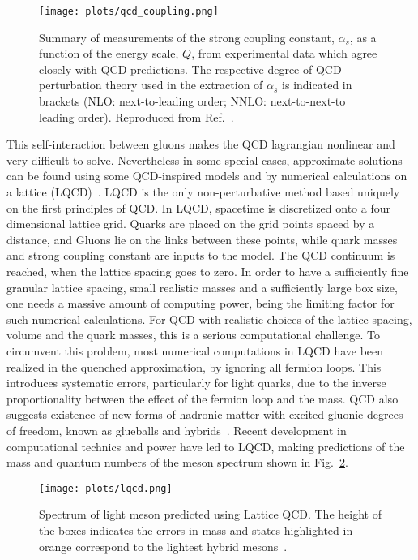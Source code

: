 \begin{figure}[!t]
    \centering
        \texttt{[image: plots/qcd\_coupling.png]}
        \caption{Summary of measurements of the strong coupling constant, $\alpha_{s}$, as a function of the energy scale, $Q$, from experimental data which agree closely with QCD predictions. The respective degree of QCD perturbation theory used in the extraction of $\alpha_{s}$ is indicated in brackets (NLO: next-to-leading order; NNLO: next-to-next-to leading order). Reproduced from Ref.~\cite{Tanabashi18}.}
        \label{fig.1.1.2}
\end{figure}

This self-interaction between gluons makes the QCD lagrangian nonlinear and very difficult to solve. Nevertheless in some special cases, approximate solutions can be found using some QCD-inspired models and by numerical calculations on a lattice (LQCD)~\cite{Dudek13}. LQCD is the only non-perturbative method based uniquely on the first principles of QCD. In LQCD, spacetime is discretized onto a four dimensional lattice grid. Quarks are placed on the grid points spaced by a distance, and Gluons lie on the links between these points, while quark masses and strong coupling constant are inputs to the model. The QCD continuum is reached, when the lattice spacing goes to zero. In order to have a sufficiently fine granular lattice spacing, small realistic masses and a sufficiently large box size, one needs a massive amount of computing power, being the limiting factor for such numerical calculations. For QCD with realistic choices of the lattice spacing, volume and the quark masses, this is a serious computational challenge. To circumvent this problem, most numerical computations in LQCD have been realized in the quenched approximation, by ignoring all fermion loops. This introduces systematic errors, particularly for light quarks, due to the inverse proportionality between the effect of the fermion loop and the mass. QCD also suggests existence of new forms of hadronic matter with excited gluonic degrees of freedom, known as glueballs and hybrids~\cite{Tanabashi18}. Recent development in computational technics and power have led to LQCD, making predictions of the mass and quantum numbers of the meson spectrum shown in Fig.~\ref{fig.1.1.3}.

\begin{landscape}
    \vspace*{\fill}
    \begin{figure}[H]
        \centering
        \texttt{[image: plots/lqcd.png]}
        \caption{Spectrum of light meson predicted using Lattice QCD. The height of the boxes indicates the errors in mass and states highlighted in orange correspond to the lightest hybrid mesons~\cite{Dudek13}.}
        \label{fig.1.1.3}
    \end{figure}
    \vspace*{\fill}
\end{landscape}

